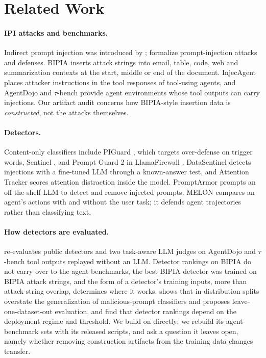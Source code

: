 \section{Related Work}
\label{sec:related}

\paragraph{IPI attacks and benchmarks.}
Indirect prompt injection was introduced by \citet{greshake2023signed}; \citet{liu2023formalizing} formalize
prompt-injection attacks and defenses. BIPIA \citep{yi2023bipia} inserts attack strings into email, table, code, web
and summarization contexts at the start, middle or end of the document. InjecAgent
\citep{zhan-etal-2024-injecagent} places attacker instructions in the tool responses of tool-using agents, and
AgentDojo \citep{debenedetti2024agentdojo} and $\tau$-bench \citep{yao2024taubench} provide agent environments whose
tool outputs can carry injections. Our artifact audit concerns how BIPIA-style insertion data is
\emph{constructed}, not the attacks themselves.

\paragraph{Detectors.}
Content-only classifiers include PIGuard \citep{li-etal-2025-piguard}, which targets over-defense on trigger words,
Sentinel \citep{ivry2025sentinel}, and Prompt Guard 2 in LlamaFirewall \citep{chennabasappa2025llamafirewall}.
DataSentinel \citep{liu2025datasentinel} detects injections with a fine-tuned LLM through a known-answer test, and
Attention Tracker \citep{hung2024attentiontracker} scores attention distraction inside the model. PromptArmor
\citep{shi2025promptarmor} prompts an off-the-shelf LLM to detect and remove injected prompts. MELON
\citep{zhu2025melon} compares an agent's actions with and without the user task; it defends agent trajectories
rather than classifying text.

\paragraph{How detectors are evaluated.}
\citet{liu2026passing} re-evaluates public detectors and two task-aware LLM judges on AgentDojo and $\tau$-bench tool
outputs replayed without an LLM. Detector rankings on BIPIA do not carry over to the agent benchmarks, the best BIPIA
detector was trained on BIPIA attack strings, and the form of a detector's training inputs, more than attack-string
overlap, determines where it works. \citet{fomin2026benchmarks} shows that in-distribution splits overstate the
generalization of malicious-prompt classifiers and proposes leave-one-dataset-out evaluation, and
\citet{akinrele2026regime} find that detector rankings depend on the deployment regime and threshold. We build on
\citet{liu2026passing} directly: we rebuild its agent-benchmark sets with its released scripts, and ask a question it
leaves open, namely whether removing construction artifacts from the training data changes transfer.

